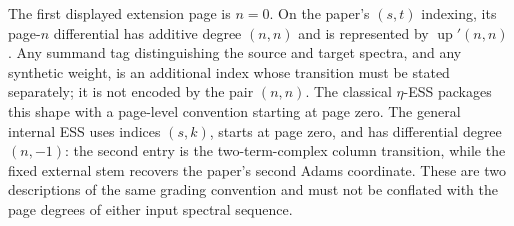 \begin{definition}
  \label{def:ess-complex-shape}
  \leanok
  The first displayed extension page is $n=0$.  On the paper's $(s,t)$
  indexing, its page-$n$ differential has additive degree $(n,n)$ and is
  represented by $\operatorname{up}'(n,n)$.  Any summand tag distinguishing
  the source and target spectra, and any synthetic weight, is an additional
  index whose transition must be stated separately; it is not encoded by the
  pair $(n,n)$.  The classical $\eta$-ESS packages this shape with a page-level
  convention starting at page zero.  The general internal ESS uses indices
  $(s,k)$, starts at page zero, and has differential degree $(n,-1)$: the
  second entry is the two-term-complex column transition, while the fixed
  external stem recovers the paper's second Adams coordinate.  These are two
  descriptions of the same grading convention and must not be conflated with
  the page degrees of either input spectral sequence.
\end{definition}

